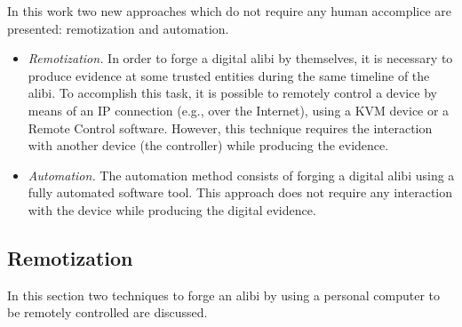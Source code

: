 \documentclass[runningheads]{llncs}
\begin{document}
In this work two new approaches which do not require any human accomplice are presented: remotization and automation.
\begin{itemize}

 \item \emph{Remotization.} In order to forge a digital alibi by themselves, it is necessary to produce evidence at some trusted entities during the same timeline of the alibi. To accomplish this task, it is possible to remotely control a device by means of an IP connection (e.g., over the Internet), using a KVM device or a Remote Control software. However, this technique requires the interaction with another device (the controller) while producing the evidence.

 \item \emph{Automation.} The automation method consists of forging a digital alibi using a fully automated software tool. This approach does not require any interaction with the device while producing the digital evidence.

\end{itemize}



\subsection{Remotization}
\label{sec:remotization}

In this section two techniques to forge an alibi by using a personal
computer to be remotely controlled are discussed.
\end{document}
